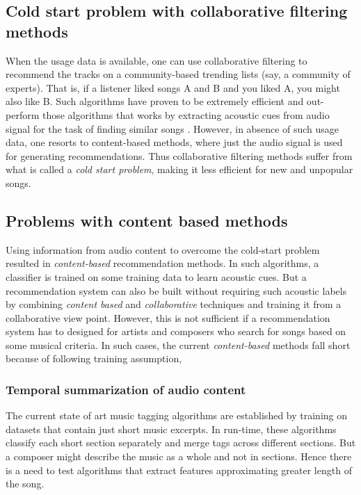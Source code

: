 \subsection{Cold start problem with collaborative filtering methods}
When the usage data is available, one can use collaborative filtering to recommend the tracks on a community-based trending lists (say, a community of experts). That is, if a listener liked songs A and B and you liked A, you might also like B. Such algorithms have proven to be extremely efficient and out-perform those algorithms that works by extracting acoustic cues from audio signal for the task of finding similar songs \cite{DC1}. However, in absence of such usage data, one resorts to content-based methods, where just the audio signal is used for generating recommendations. Thus collaborative filtering methods suffer from what is called a \textit{cold start problem}, making it less efficient for new and unpopular songs. 


\subsection{Problems with content based methods}
\label{problems}
Using information from audio content to overcome the cold-start problem resulted in \textit{content-based} recommendation methods. In such algorithms, a classifier is trained on some training data to learn acoustic cues. But a recommendation system can also be built without requiring  such acoustic labels by combining \textit{content based} and \textit{collaborative} techniques\cite{combining} and training it from a collaborative view point. However, this is not sufficient if a recommendation system has to designed for artists and composers who search for songs based on some musical criteria. In such cases, the current \textit{content-based} methods fall short because of following training assumption,   


\subsubsection{Temporal summarization of audio content}
The current state of art music tagging algorithms\cite{choi_crnn}\cite{MultiScale} are established by training on datasets that contain just short music excerpts. In run-time, these algorithms classify each short section separately and merge tags across different sections. But a composer might describe the music as a whole and not in sections. Hence there is a need to test algorithms that extract features approximating greater length of the song. 

